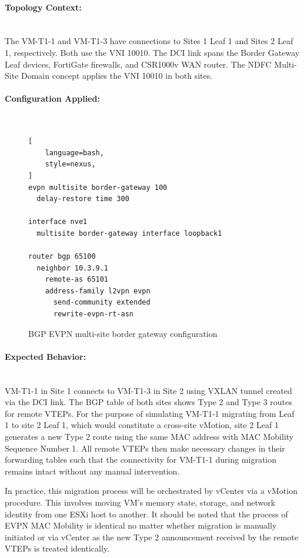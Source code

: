 \paragraph{Topology Context:}~\\
The VM-T1-1 and VM-T1-3 have connections to Sites 1 Leaf 1 and Sites 2 Leaf 1, respectively. Both use the VNI 10010. The DCI link spans the Border Gateway Leaf devices, FortiGate firewalls, and CSR1000v WAN router. The NDFC Multi-Site Domain concept applies the VNI 10010 in both sites.

\paragraph{Configuration Applied:}~\\
\begin{figure}[!htbp]
\centering
\begin{lstlisting}[
    language=bash,
    style=nexus,
]
evpn multisite border-gateway 100
  delay-restore time 300

interface nve1
  multisite border-gateway interface loopback1

router bgp 65100
  neighbor 10.3.9.1
    remote-as 65101
    address-family l2vpn evpn
      send-community extended
      rewrite-evpn-rt-asn
\end{lstlisting}
\caption{BGP EVPN multi-site border gateway configuration}
\label{fig:scenario4-bgp-evpn-ms}
\end{figure}

\paragraph{Expected Behavior:}~\\
VM-T1-1 in Site 1 connects to VM-T1-3 in Site 2 using VXLAN tunnel created via the DCI link. The BGP table of both sites shows Type 2 and Type 3 routes for remote VTEPs. For the purpose of simulating VM-T1-1 migrating from Leaf 1 to site 2 Leaf 1, which would constitute a cross-site vMotion, site 2 Leaf 1 generates a new Type 2 route using the same MAC address with MAC Mobility Sequence Number 1. All remote VTEPs then make necessary changes in their forwarding tables such that the connectivity for VM-T1-1 during migration remains intact without any manual intervention.

In practice, this migration process will be orchestrated by vCenter via a vMotion procedure. This involves moving VM's memory state, storage, and network identity from one ESXi host to another. It should be noted that the process of EVPN MAC Mobility is identical no matter whether migration is manually initiated or via vCenter as the new Type 2 announcement received by the remote VTEPs is treated identically.

